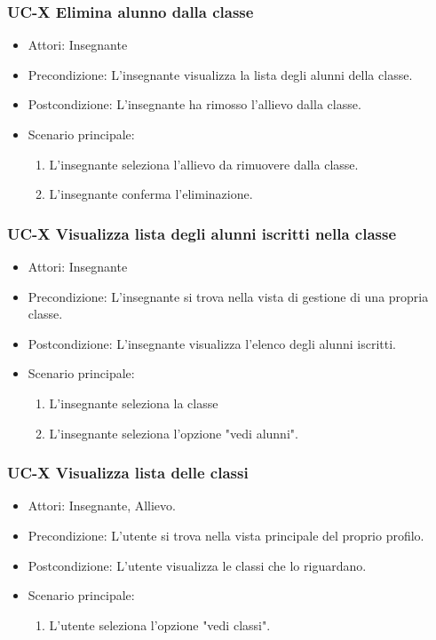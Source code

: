 \subsubsection{UC-X Elimina alunno dalla classe}		
\begin{itemize}
	\item Attori: Insegnante
	\item Precondizione: L'insegnante visualizza la lista degli alunni della classe.
	\item Postcondizione: L'insegnante ha rimosso l'allievo dalla classe.
	\item Scenario principale:
	\begin{enumerate}
		\item L'insegnante seleziona l'allievo da rimuovere dalla classe.
		\item L'insegnante conferma l'eliminazione.
	\end{enumerate}		
\end{itemize}

\subsubsection{UC-X Visualizza lista degli alunni iscritti nella classe}		
\begin{itemize}
	\item Attori: Insegnante
	\item Precondizione: L'insegnante si trova nella vista di gestione di una propria classe.
	\item Postcondizione: L'insegnante visualizza l'elenco degli alunni iscritti.
	\item Scenario principale:
	\begin{enumerate}
		\item L'insegnante seleziona la classe
		\item L'insegnante seleziona l'opzione "vedi alunni".
	\end{enumerate}		
\end{itemize}

\subsubsection{UC-X Visualizza lista delle classi}		
\begin{itemize}
	\item Attori: Insegnante, Allievo.
	\item Precondizione: L'utente si trova nella vista principale del proprio profilo.
	\item Postcondizione: L'utente visualizza le classi che lo riguardano.
	\item Scenario principale:
	\begin{enumerate}
		\item L'utente seleziona l'opzione "vedi classi".
	\end{enumerate}		
\end{itemize}

